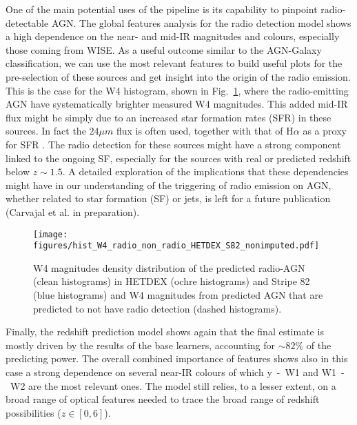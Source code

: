 \documentclass{aa}
\begin{document}
One of the main potential uses of the pipeline is its capability to pinpoint radio-detectable AGN. The global features analysis for the radio detection model shows a high dependence on the near- and mid-IR magnitudes and colours, especially those coming from WISE. As a useful outcome similar to the AGN-Galaxy classification, we can use the most relevant features to build useful plots for the pre-selection of these sources and get insight into the origin of the radio emission. This is the case for the W4 histogram, shown in Fig.~\ref{fig:hist_W4_nonimputed_pred_radio_non_radio_AGN}, where the radio-emitting AGN have systematically brighter measured W4 magnitudes. This added mid-IR flux might be simply due to an increased star formation rates (SFR) in these sources. In fact the $24\mu m$ flux is often used, together with that of H$\alpha$ as a proxy for SFR \citep{2009ApJ...703.1672K}. The radio detection for these sources might have a strong component linked to the ongoing SF, especially for the sources with real or predicted redshift below ${z {\sim} 1.5}$. A detailed exploration of the implications that these dependencies might have in our understanding of the triggering of radio emission on AGN, whether related to star formation (SF) or jets, is left for a future publication (Carvajal et al. in preparation).

\begin{figure}
  \centering
    \texttt{[image: figures/hist\_W4\_radio\_non\_radio\_HETDEX\_S82\_nonimputed.pdf]}
  \caption{W4 magnitudes density distribution of the predicted radio-AGN  (clean histograms) in HETDEX (ochre histograms) and Stripe 82 (blue histograms) and W4 magnitudes from predicted AGN that are predicted to not have radio detection (dashed histograms).}
  \label{fig:hist_W4_nonimputed_pred_radio_non_radio_AGN}
\end{figure}

Finally, the redshift prediction model shows again that the final estimate is mostly driven by the results of the base learners, accounting for ${\sim} 82\%$ of the predicting power. The overall combined importance of features shows also in this case a strong dependence on several near-IR colours of which y~-~W1 and W1~-~W2 are the most relevant ones. 
The model still relies, to a lesser extent, on a broad range of optical features needed to trace the broad range of redshift possibilities ($z \in [0,6]$).%
\end{document}

